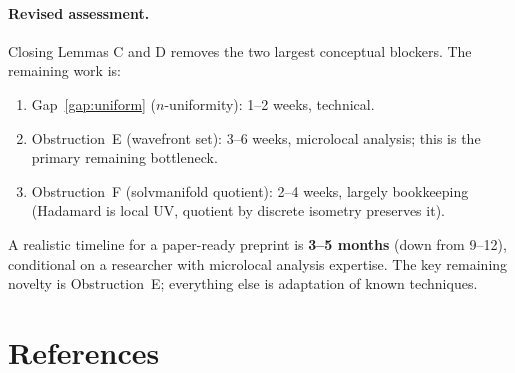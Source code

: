 \documentclass[11pt,a4paper]{article}
\theoremstyle{definition}
\begin{document}
\paragraph{Revised assessment.}
Closing Lemmas C and D removes the two largest conceptual blockers.
The remaining work is:
\begin{enumerate}
  \item Gap~\ref{gap:uniform} ($n$-uniformity): 1--2 weeks, technical.
  \item Obstruction~E (wavefront set): 3--6 weeks, microlocal analysis; this is the
        primary remaining bottleneck.
  \item Obstruction~F (solvmanifold quotient): 2--4 weeks, largely bookkeeping
        (Hadamard is local UV, quotient by discrete isometry preserves it).
\end{enumerate}
A realistic timeline for a paper-ready preprint is \textbf{3--5 months}
(down from 9--12), conditional on a researcher with microlocal analysis expertise.
The key remaining novelty is Obstruction~E; everything else is adaptation of
known techniques.

\section*{References}
\end{document}
